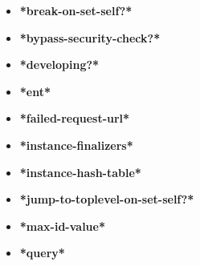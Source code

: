 \documentclass [11pt]{book}
\begin{document}
\begin{itemize}

\item {}
\label{prim:*break-on-set-self?*}
\textbf{*break-on-set-self?*}





\item {}
\label{prim:*bypass-security-check?*}
\textbf{*bypass-security-check?*}





\item {}
\label{prim:*developing?*}
\textbf{*developing?*}





\item {}
\label{prim:*ent*}
\textbf{*ent*}





\item {}
\label{prim:*failed-request-url*}
\textbf{*failed-request-url*}





\item {}
\label{prim:*instance-finalizers*}
\textbf{*instance-finalizers*}





\item {}
\label{prim:*instance-hash-table*}
\textbf{*instance-hash-table*}





\item {}
\label{prim:*jump-to-toplevel-on-set-self?*}
\textbf{*jump-to-toplevel-on-set-self?*}





\item {}
\label{prim:*max-id-value*}
\textbf{*max-id-value*}





\item {}
\label{prim:*query*}
\textbf{*query*}






\end{itemize}
\end{document}

